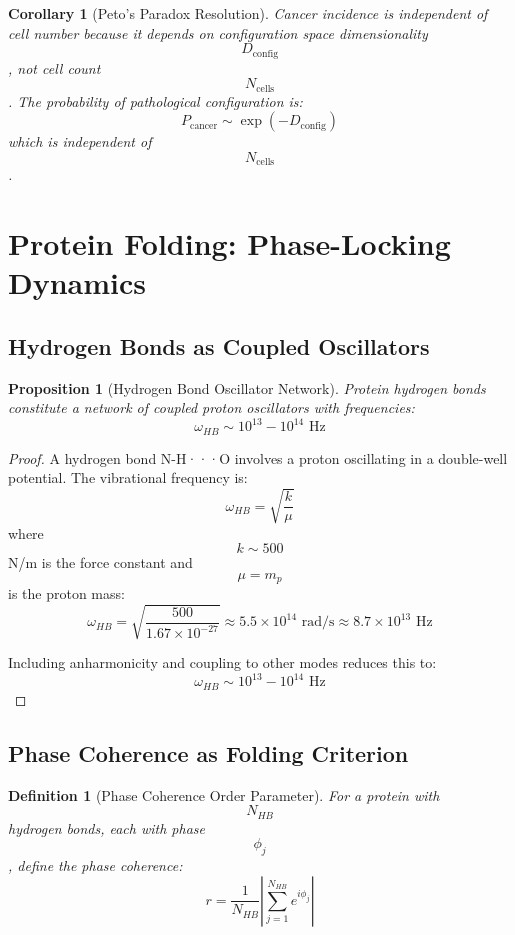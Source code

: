 \documentclass[12pt,a4paper]{article}
\newtheorem{proposition}[theorem]{Proposition}
\newtheorem{corollary}[theorem]{Corollary}
\newtheorem{definition}{Definition}
\begin{document}
\begin{corollary}[Peto's Paradox Resolution]
Cancer incidence is independent of cell number because it depends on configuration space dimensionality $$D_{\text{config}}$$, not cell count $$N_{\text{cells}}$$. The probability of pathological configuration is:
$$
P_{\text{cancer}} \sim \exp(-D_{\text{config}})
$$
which is independent of $$N_{\text{cells}}$$.
\end{corollary}

\section{Protein Folding: Phase-Locking Dynamics}

\subsection{Hydrogen Bonds as Coupled Oscillators}

\begin{proposition}[Hydrogen Bond Oscillator Network]
Protein hydrogen bonds constitute a network of coupled proton oscillators with frequencies:
$$
\omega_{HB} \sim 10^{13} - 10^{14} \text{ Hz}
$$
\end{proposition}

\begin{proof}
A hydrogen bond N-H···O involves a proton oscillating in a double-well potential. The vibrational frequency is:
$$
\omega_{HB} = \sqrt{\frac{k}{\mu}}
$$
where $$k \sim 500$$ N/m is the force constant and $$\mu = m_p$$ is the proton mass:
$$
\omega_{HB} = \sqrt{\frac{500}{1.67 \times 10^{-27}}} \approx 5.5 \times 10^{14} \text{ rad/s} \approx 8.7 \times 10^{13} \text{ Hz}
$$

Including anharmonicity and coupling to other modes reduces this to:
$$
\omega_{HB} \sim 10^{13} - 10^{14} \text{ Hz}
$$
\end{proof}

\subsection{Phase Coherence as Folding Criterion}

\begin{definition}[Phase Coherence Order Parameter]
For a protein with $$N_{HB}$$ hydrogen bonds, each with phase $$\phi_j$$, define the phase coherence:
$$
r = \frac{1}{N_{HB}} \left| \sum_{j=1}^{N_{HB}} e^{i\phi_j} \right|
$$
\end{definition}
\end{document}
